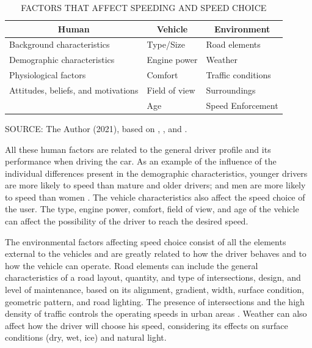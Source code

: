 \begin{table}[!hbtp]
    \footnotesize
    \captionsetup{justification=raggedright,
        singlelinecheck=false,
        font=footnotesize}
    \caption{FACTORS THAT AFFECT SPEEDING AND SPEED CHOICE}
    \centering
    \begin{tabular}{lll}
    \hline
    \multicolumn{1}{c}{\textbf{Human}}                  & \multicolumn{1}{c}{\textbf{Vehicle}} & \multicolumn{1}{c}{\textbf{Environment}} \\ \hline
    Background characteristics      & Type/Size        & Road elements        \\
    Demographic characteristics     & Engine power     & Weather              \\
    Physiological factors           & Comfort          & Traffic conditions   \\
    Attitudes, beliefs, and motivations & Field of view    & Surroundings    \\
                                    & Age              & Speed Enforcement    \\ \hline
\end{tabular}
    \label{tab:spdfct}
    \par \vspace{2mm} \footnotesize \raggedright
    SOURCE: The Author (2021), based on \textcite{Richard2013a}, \textcite{Shinar2017}, and \textcite{WHO2008}.
\end{table}

All these human factors are related to the general driver profile and its performance when driving the car. As an example of the influence of the individual differences present in the demographic characteristics, younger drivers are more likely to speed than mature and older drivers; and men are more likely to speed than women \cite{Shinar2017}. The vehicle characteristics also affect the speed choice of the user. The type, engine power, comfort, field of view, and age of the vehicle can affect the possibility of the driver to reach the desired speed. 

The environmental factors affecting speed choice consist of all the elements external to the vehicles and are greatly related to how the driver behaves and to how the vehicle can operate. Road elements can include the general characteristics of a road layout, quantity, and type of intersections, design, and level of maintenance, based on its alignment, gradient, width, surface condition, geometric pattern, and road lighting. The presence of intersections and the high density of traffic controls the operating speeds in urban areas \cite{Mohan2016a}. Weather can also affect how the driver will choose his speed, considering its effects on surface conditions (dry, wet, ice) and natural light.  

